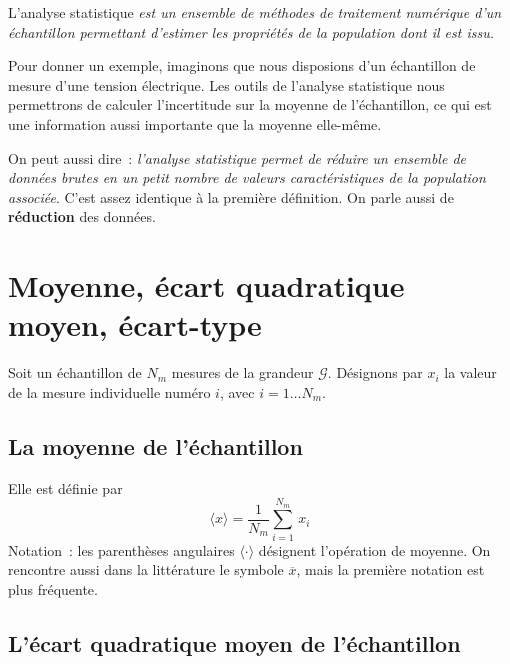 L'analyse statistique \textit{est un ensemble de méthodes de traitement numérique d'un échantillon permettant d'estimer les propriétés de la population dont il est issu.}

Pour donner un exemple, imaginons que nous disposions d'un échantillon de mesure d'une tension électrique. Les outils de l'analyse statistique nous permettrons de calculer l'incertitude sur la moyenne de l'échantillon, ce qui est une information aussi importante que la moyenne elle-même.

On peut aussi dire~: \textit{l'analyse statistique permet de réduire un ensemble de données brutes en un petit nombre de valeurs caractéristiques de la population associée}. C'est assez identique à la première définition. On parle aussi de \textbf{réduction} des données.

\section{Moyenne, écart quadratique moyen, écart-type}

Soit un échantillon de $N_m$ mesures de la grandeur $\mathcal{G}$. Désignons par $x_i$ la valeur de la mesure individuelle numéro $i$, avec $i=1\dots N_m$.

\subsection{La moyenne de l'échantillon}

Elle est définie par
\begin{equation}
\langle x\rangle=\frac{1}{N_m}\sum\limits_{i=1}^{N_m}\,x_i
\end{equation}
Notation~: les parenthèses angulaires $\langle\cdot\rangle$ désignent l'opération de moyenne. On rencontre aussi dans la littérature le symbole $\overline{x}$, mais la première notation est plus fréquente.

\subsection{L'écart quadratique moyen de l'échantillon}

